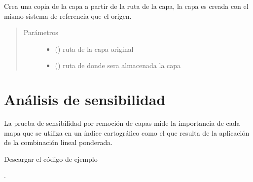 \documentclass[letterpaper,10pt,spanish]{sphinxmanual}
\begin{document}

\begin{fulllineitems}
\label{\detokenize{apcsig:apcsig.vcopia}}
Crea una copia de la capa a partir de la ruta de la capa,
la capa es creada con el mismo sistema de referencia que el origen.
\begin{quote}\begin{description}
\item[{Parámetros}] \leavevmode\begin{itemize}
\item {} 
 () \textendash{} ruta de la capa original

\item {} 
 () \textendash{} ruta de donde sera almacenada la capa

\end{itemize}

\end{description}\end{quote}

\end{fulllineitems}



\chapter{Análisis de sensibilidad}
\label{\detokenize{analisis:analisis-de-sensibilidad}}\label{\detokenize{analisis::doc}}
La prueba de sensibilidad por remoción de capas mide la importancia de cada mapa que se utiliza en un índice cartográfico como el que resulta de la aplicación de la combinación lineal ponderada.

Descargar el código de ejemplo

.
\end{document}
